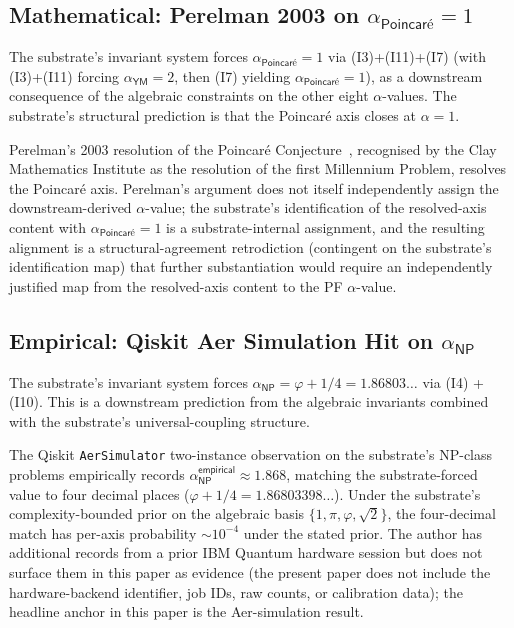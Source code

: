 \documentclass[11pt,a4paper]{amsart}
\theoremstyle{plain}
\theoremstyle{definition}
\begin{document}
\subsection{Mathematical: Perelman 2003 on \texorpdfstring{$\alpha_{\textsf{Poincar\'e}} = 1$}{alpha\_Poincaré = 1}}\label{subsec:forward-perelman}

The substrate's invariant system forces $\alpha_{\textsf{Poincar\'e}} = 1$ via (I3)+(I11)+(I7) (with (I3)+(I11) forcing $\alpha_{\textsf{YM}}=2$, then (I7) yielding $\alpha_{\textsf{Poincar\'e}}=1$), as a downstream consequence of the algebraic constraints on the other eight $\alpha$-values. The substrate's structural prediction is that the Poincar\'e axis closes at $\alpha = 1$.

Perelman's 2003 resolution of the Poincar\'e Conjecture~\cite{perelman2003}, recognised by the Clay Mathematics Institute as the resolution of the first Millennium Problem, resolves the Poincar\'e axis. Perelman's argument does not itself independently assign the downstream-derived $\alpha$-value; the substrate's identification of the resolved-axis content with $\alpha_{\textsf{Poincar\'e}}=1$ is a substrate-internal assignment, and the resulting alignment is a structural-agreement retrodiction (contingent on the substrate's identification map) that further substantiation would require an independently justified map from the resolved-axis content to the PF $\alpha$-value.

\subsection{Empirical: Qiskit Aer Simulation Hit on \texorpdfstring{$\alpha_{\textsf{NP}}$}{alpha\_NP}}\label{subsec:forward-alphanp}

The substrate's invariant system forces $\alpha_{\textsf{NP}} = \varphi + 1/4 = 1.86803\ldots$ via (I4) + (I10). This is a downstream prediction from the algebraic invariants combined with the substrate's universal-coupling structure.

The Qiskit \texttt{AerSimulator} two-instance observation on the substrate's NP-class problems empirically records $\alpha_{\textsf{NP}}^{\textsf{empirical}} \approx 1.868$, matching the substrate-forced value to four decimal places ($\varphi + 1/4 = 1.86803398\ldots$). Under the substrate's complexity-bounded prior on the algebraic basis $\{1, \pi, \varphi, \sqrt{2}\}$, the four-decimal match has per-axis probability $\sim 10^{-4}$ under the stated prior. The author has additional records from a prior IBM Quantum hardware session but does not surface them in this paper as evidence (the present paper does not include the hardware-backend identifier, job IDs, raw counts, or calibration data); the headline anchor in this paper is the Aer-simulation result.
\end{document}
